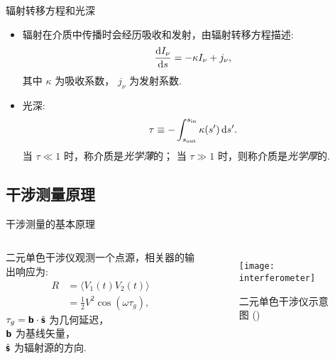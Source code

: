 \documentclass{beamer}
\begin{document}
\begin{frame}{辐射转移方程和光深}
  \begin{itemize}
    \item 辐射在介质中传播时会经历吸收和发射，由\alert{辐射转移方程}描述:
      \begin{equation}
        \frac{\text{d}I_{\nu}}{\text{d}s} = -\kappa I_{\nu} + j_{\nu} ,
      \end{equation}
      其中 $\kappa$ 为吸收系数， $j_{\nu}$ 为发射系数.
    \item \alert{光深}:
      \begin{equation}
        \tau \equiv
          - \int_{s_{\text{out}}}^{s_{\text{in}}} \kappa(s') \,\text{d}s' .
      \end{equation}
      当 $\tau \ll 1$ 时，称介质是\emph{光学薄}的；
      当 $\tau \gg 1$ 时，则称介质是\emph{光学厚}的.
  \end{itemize}
\end{frame}

\subsection{干涉测量原理}

\begin{frame}{干涉测量的基本原理}
  \begin{columns}
    二元单色干涉仪观测一个点源，相关器的输出响应为:
    \begin{align}
      R & = \langle V_1(t) V_2(t) \rangle \\
        & = \frac{1}{2} V^2 \cos (\omega \tau_g) ,
    \end{align}
    $\tau_g = \bm{\mathsf{b}} \cdot \hat{\bm{\mathsf{s}}}$ 为几何延迟，\\
    $\bm{\mathsf{b}}$ 为基线矢量，\\
    $\hat{\bm{\mathsf{s}}}$ 为辐射源的方向.

    \begin{figure}
      \centering
      \texttt{[image: interferometer]}
      \caption{二元单色干涉仪示意图 (\cite{condon2016})}
    \end{figure}
  \end{columns}
\end{frame}
\end{document}
